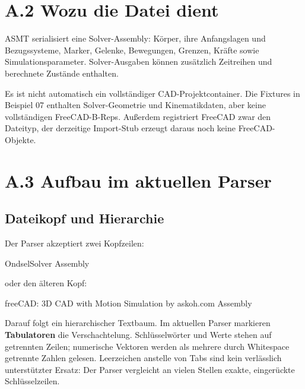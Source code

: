 \documentclass[
  12pt
]{book}
\newenvironment{Shaded}{}{}
\newcommand{\NormalTok}[1]{#1}
\begin{document}
\hypertarget{wozu-die-datei-dient}{%
\section{\texorpdfstring{{A.2} Wozu die Datei
dient}{A.2 Wozu die Datei dient}}\label{wozu-die-datei-dient}}

ASMT serialisiert eine Solver-Assembly: Körper, ihre Anfangslagen und
Bezugssysteme, Marker, Gelenke, Bewegungen, Grenzen, Kräfte sowie
Simulationsparameter. Solver-Ausgaben können zusätzlich Zeitreihen und
berechnete Zustände enthalten.

Es ist nicht automatisch ein vollständiger CAD-Projektcontainer. Die
Fixtures in Beispiel 07 enthalten Solver-Geometrie und Kinematikdaten,
aber keine vollständigen FreeCAD-B-Reps. Außerdem registriert FreeCAD
zwar den Dateityp, der derzeitige Import-Stub erzeugt daraus noch keine
FreeCAD-Objekte.

\hypertarget{aufbau-im-aktuellen-parser}{%
\section{\texorpdfstring{{A.3} Aufbau im aktuellen
Parser}{A.3 Aufbau im aktuellen Parser}}\label{aufbau-im-aktuellen-parser}}

\hypertarget{dateikopf-und-hierarchie}{%
\subsection*{Dateikopf und Hierarchie}\label{dateikopf-und-hierarchie}}

Der Parser akzeptiert zwei Kopfzeilen:

\begin{Shaded}
\begin{Highlighting}[]
\NormalTok{OndselSolver}
\NormalTok{Assembly}
\end{Highlighting}
\end{Shaded}

oder den älteren Kopf:

\begin{Shaded}
\begin{Highlighting}[]
\NormalTok{freeCAD: 3D CAD with Motion Simulation  by  askoh.com}
\NormalTok{Assembly}
\end{Highlighting}
\end{Shaded}

Darauf folgt ein hierarchischer Textbaum. Im aktuellen Parser markieren
\textbf{Tabulatoren} die Verschachtelung. Schlüsselwörter und Werte
stehen auf getrennten Zeilen; numerische Vektoren werden als mehrere
durch Whitespace getrennte Zahlen gelesen. Leerzeichen anstelle von Tabs
sind kein verlässlich unterstützter Ersatz: Der Parser vergleicht an
vielen Stellen exakte, eingerückte Schlüsselzeilen.
\end{document}
